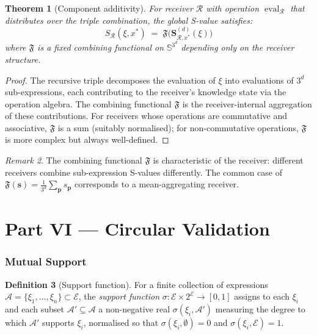 \documentclass[twocolumn,11pt,a4paper]{article}
\theoremstyle{thmstyle}
\newtheorem{theorem}{Theorem}[section]
\theoremstyle{thmstyle}
\theoremstyle{definition}
\newtheorem{definition}[theorem]{Definition}
\theoremstyle{remark}
\newtheorem{remark}[theorem]{Remark}
\DeclareMathOperator{\eval}{eval}
\newcommand{\Sscale}{\mathbb{S}}
\newcommand{\Expr}{\mathcal{E}}
\newcommand{\Ax}{\mathcal{A}}
\newcommand{\receiver}{\mathcal{R}}
\newcommand{\Sscalar}{S}
\begin{document}
\begin{theorem}[Component additivity]\label{thm:comp-add}
For receiver $\receiver$ with operation
$\eval_{\receiver}$ that distributes over the triple
combination, the global S-value satisfies:
\[
\Sscalar_{\receiver}(\xi, x^{*})
\;=\; \mathfrak{F}\bigl(
   \bm{S}^{(d)}_{\receiver, x^{*}}(\xi) \bigr)
\]
where $\mathfrak{F}$ is a fixed combining functional
on $\Sscale^{3^{d}}$ depending only on the
receiver structure.
\end{theorem}

\begin{proof}
The recursive triple decomposes the evaluation of
$\xi$ into evaluations of $3^{d}$ sub-expressions,
each contributing to the receiver's knowledge state
via the operation algebra.  The combining functional
$\mathfrak{F}$ is the receiver-internal aggregation
of these contributions.  For receivers whose
operations are commutative and associative,
$\mathfrak{F}$ is a sum (suitably normalised); for
non-commutative operations, $\mathfrak{F}$ is more
complex but always well-defined.
\end{proof}

\begin{remark}\label{rem:f-as-receiver-property}
The combining functional $\mathfrak{F}$ is
characteristic of the receiver: different receivers
combine sub-expression S-values differently.  The
common case of $\mathfrak{F}(\bm{s}) = \frac{1}{3^{d}}
\sum_{\bm{p}} s_{\bm{p}}$ corresponds to a
mean-aggregating receiver.
\end{remark}



\part*{Part VI --- Circular Validation}

\section{Mutual Support}
\label{sec:mutual-support}

\begin{definition}[Support function]\label{def:support}
For a finite collection of expressions
$\Ax = \{\xi_{1}, \ldots, \xi_{n}\} \subset \Expr$, the
\emph{support function} $\sigma : \Expr \times
2^{\Expr} \to [0, 1]$ assigns to each $\xi_{i}$ and
each subset $\Ax' \subseteq \Ax$ a non-negative real
$\sigma(\xi_{i}, \Ax')$ measuring the degree to which
$\Ax'$ supports $\xi_{i}$, normalised so that
$\sigma(\xi_{i}, \emptyset) = 0$ and
$\sigma(\xi_{i}, \Expr) = 1$.
\end{definition}
\end{document}
